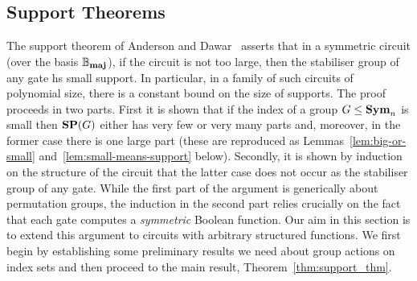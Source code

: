 \documentclass[../paper.tex]{subfiles}
\begin{document}
\subsection{Support Theorems}
The support theorem of Anderson and Dawar~\cite{AndersonD17} asserts
that in a symmetric circuit (over the basis $\mathbb{B}_{\text{\textbf{maj}}}$), if
the circuit is not too large, then the stabiliser group of any gate hs
small support.  In particular, in a family of such circuits of
polynomial size, there is a constant bound on the size of supports.
The proof proceeds in two parts.  First it is shown that if the index
of a group $G \leq \text{\textbf{Sym}}_n$ is small then $\text{\textbf{SP}}(G)$ either has very few
or very many parts and, moreover, in the former case there is one
large part (these are reproduced as Lemmas~\ref{lem:big-or-small}
and~\ref{lem:small-means-support} below).  Secondly, it is shown by
induction on the structure of the circuit that the latter case does
not occur as the stabiliser group of any gate.
While the first part of the argument is generically about permutation
groups, the induction in the second part relies crucially on the fact
that each gate computes a \emph{symmetric} Boolean function.  Our aim
in this section is to extend this argument to circuits with
arbitrary structured functions.  We first begin by establishing some
preliminary results we need about group actions on index sets and then
proceed to the main result, Theorem~\ref{thm:support_thm}.





\end{document}
